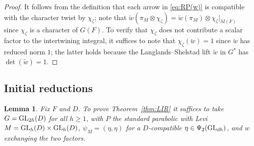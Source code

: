 \documentclass[11pt,reqno]{amsart}
\theoremstyle{plain}
\newtheorem{lem}[thm]{Lemma}
\theoremstyle{definition}
\newcommand{\GL}{\tu{GL}}
\newcommand{\tu}{\textup}
\numberwithin{equation}{subsection}
\begin{document}
\begin{proof}
It follows from the definition that each arrow in \eqref{eq:RP(w)} is compatible with the character twist by $\chi_\zeta$; note that $\breve{w}(\pi_M\otimes\chi_\zeta)=\breve{w}(\pi_M)\otimes\chi_\zeta|_{M(F)}$ since $\chi_\zeta$ is a character of $G(F)$. To verify that $\chi_\zeta$ does not contribute a scalar factor to the intertwining integral, it suffices to note that $\chi_\zeta(\breve{w})=1$ since $\breve{w}$ has reduced norm $1$; the latter holds because the Langlands--Shelstad lift $\tilde{w}$ in $G^*$ has $\det(\tilde{w})=1$.
\end{proof}

\subsection{Initial reductions}

\begin{lem}\label{lem:reduction-to-maximal-Levi}
Fix $F$ and $D$. To prove Theorem~\ref{thm:LIR} it suffices to take
$G=\GL_{2h}(D)$ for all $h\geq 1$, with $P$ the standard parabolic
with Levi $M=\GL_h(D)\times\GL_h(D)$, $\psi_M=(\eta,\eta)$ for a
$D$-compatible $\eta\in\Psi_2(\GL_{dh})$, and $w$ exchanging the two
factors.
\end{lem}
\end{document}

